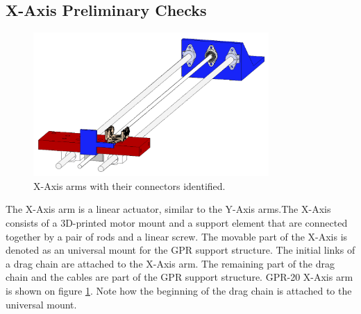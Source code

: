 \documentclass{article}
\begin{document}
\subsection{X-Axis Preliminary Checks}
\begin{figure}[H]
    \centering
    \includegraphics[width=0.8\textwidth]{images/requirements/x_axis.png}
    \caption{X-Axis arms with their connectors identified.}
    \label{fig:considerations_x_arm}
\end{figure}
The X-Axis arm is a linear actuator, similar to the Y-Axis arms.The X-Axis consists of a 3D-printed motor mount and a support element that are connected together by a pair of rods and a linear screw. The movable part of the X-Axis is denoted as an universal mount for the GPR support structure. The initial links of a drag chain are attached to the X-Axis arm. The remaining part of the drag chain and the cables are part of the GPR support structure. GPR-20 X-Axis arm is shown on figure \ref{fig:considerations_x_arm}. Note how the beginning of the drag chain is attached to the universal mount.
\end{document}
